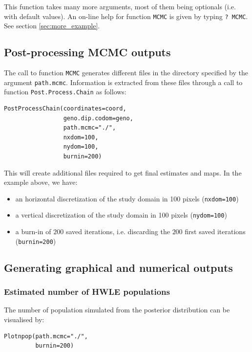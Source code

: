 \documentclass{article}
\begin{document}
 
This function takes many more arguments, most of them being optionals (i.e. with default values).
An on-line help for function \texttt{MCMC} is given by typing \texttt{? MCMC}. See section \ref{sec:more_example}.


\subsection{Post-processing MCMC outputs}

The call to function \texttt{MCMC} generates different files in the directory specified by the argument \texttt{path.mcmc}. 
Information is extracted from these files through a call to function \texttt{Post.Process.Chain} 
as follows:

\begin{verbatim}
PostProcessChain(coordinates=coord,
                 geno.dip.codom=geno,
                 path.mcmc="./",
                 nxdom=100,
                 nydom=100,
                 burnin=200)
\end{verbatim}



This will create additional files required to get final estimates and maps. In the example above, we have: 
\begin{itemize}
\item an horizontal  discretization of the study domain in 100 pixels (\texttt{nxdom=100})
\item a vertical  discretization of the study domain in 100 pixels (\texttt{nydom=100})
\item a burn-in of $200$ saved  iterations, i.e. discarding the $200$ first saved iterations (\texttt{burnin=200})
\end{itemize}


\subsection{Generating graphical and numerical outputs}

\subsubsection{Estimated number  of HWLE populations}
The number of population simulated from the posterior distribution can be visualised by:

\begin{verbatim}
Plotnpop(path.mcmc="./",
         burnin=200)
\end{verbatim}
\end{document}
